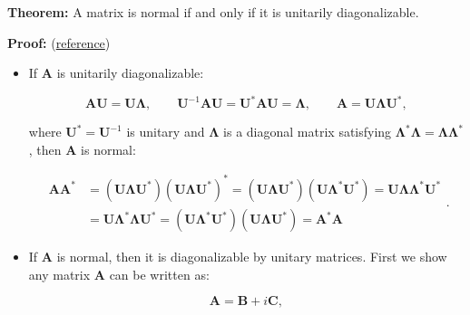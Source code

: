 \documentclass[10pt,b5paper,titlepage]{book}
\begin{document}
\textbf{Theorem:} A matrix is normal if and only if it is unitarily diagonalizable.

\textbf{Proof:} (\href{http://scipp.ucsc.edu/~haber/ph116A/diag_11.pdf}{reference})

\begin{itemize}
    \item If $\mathbf{A}$ is unitarily diagonalizable:

        \begin{equation}
            \mathbf{A}\mathbf{U} = \mathbf{U}\mathbf{\Lambda}
            , \qquad
            \mathbf{U}^{-1}\mathbf{A}\mathbf{U}
            = \mathbf{U}^{*}\mathbf{A}\mathbf{U} = \mathbf{\Lambda}
            , \qquad
            \mathbf{A} = \mathbf{U}\mathbf{\Lambda}\mathbf{U}^{*}
        ,\end{equation}

        where $\mathbf{U}^{*} = \mathbf{U}^{-1}$ is unitary and $\mathbf{\Lambda}$
        is a diagonal matrix satisfying
        $\mathbf{\Lambda}^{*}\mathbf{\Lambda} = \mathbf{\Lambda}\mathbf{\Lambda}^{*}$,
        then $\mathbf{A}$ is normal:

        \begin{equation}
            \begin{array}{ll}
                \mathbf{A}\mathbf{A}^{*}
                &= (\mathbf{U}\mathbf{\Lambda}\mathbf{U}^{*})
                (\mathbf{U}\mathbf{\Lambda}\mathbf{U}^{*})^{*}
                = (\mathbf{U}\mathbf{\Lambda}\mathbf{U}^{*})
                (\mathbf{U}\mathbf{\Lambda}^{*}\mathbf{U}^{*})
                = \mathbf{U}\mathbf{\Lambda}\mathbf{\Lambda}^{*}\mathbf{U}^{*} \\
                &= \mathbf{U}\mathbf{\Lambda}^{*}\mathbf{\Lambda}\mathbf{U}^{*}
                = (\mathbf{U}\mathbf{\Lambda}^{*}\mathbf{U}^{*})
                (\mathbf{U}\mathbf{\Lambda}\mathbf{U}^{*})
                = \mathbf{A}^{*}\mathbf{A}
            \end{array}
        .\end{equation}

    \item If $\mathbf{A}$ is normal, then it is diagonalizable by unitary matrices.
        First we show any matrix $\mathbf{A}$ can be written as:

        \begin{equation}
            \mathbf{A} = \mathbf{B} + i \mathbf{C}
        ,\end{equation}


\end{itemize}
\end{document}
